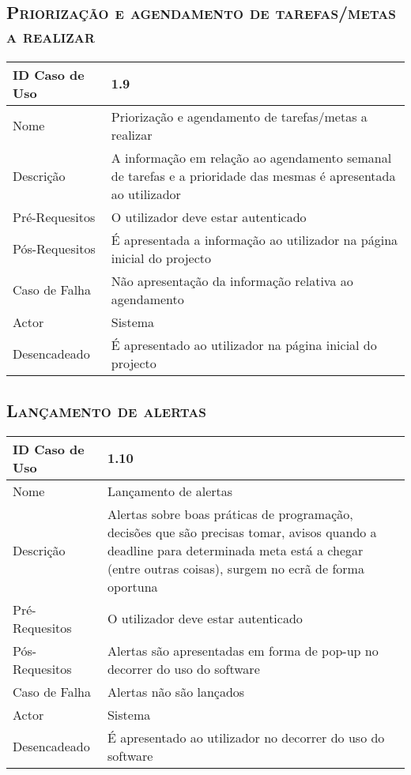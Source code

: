 \documentclass[12pt]{article}
\begin{document}
\subsection{ \textsc{Priorização e agendamento de tarefas/metas a realizar}}

\begin{center}
\begin{tabular}{ | m{4cm} | m{10cm} | } 
\hline
ID Caso de Uso & 1.9\\
\hline
Nome & Priorização e agendamento de tarefas/metas a realizar\\
\hline
Descrição & A informação em relação ao agendamento semanal de tarefas e a prioridade das mesmas é apresentada ao utilizador\\
\hline
Pré-Requesitos & O utilizador deve estar autenticado\\
\hline
Pós-Requesitos & É apresentada a informação ao utilizador na página inicial do projecto\\
\hline
Caso de Falha & Não apresentação da informação relativa ao agendamento\\
\hline
Actor & Sistema\\
\hline
Desencadeado & É apresentado ao utilizador na página inicial do projecto\\
\hline
\end{tabular}
\end{center}


\subsection{ \textsc{Lançamento de alertas}}

\begin{center}
\begin{tabular}{ | m{4cm} | m{10cm} | } 
\hline
ID Caso de Uso & 1.10\\
\hline
Nome & Lançamento de alertas\\
\hline
Descrição & Alertas sobre boas práticas de programação, decisões que são precisas tomar, avisos quando a deadline para determinada meta está a chegar (entre outras coisas), surgem no ecrã de forma oportuna\\
\hline
Pré-Requesitos & O utilizador deve estar autenticado\\
\hline
Pós-Requesitos & Alertas são apresentadas em forma de pop-up no decorrer do uso do software\\
\hline
Caso de Falha & Alertas não são lançados\\
\hline
Actor & Sistema\\
\hline
Desencadeado & É apresentado ao utilizador no decorrer do uso do software\\
\hline
\end{tabular}
\end{center}
\end{document}
